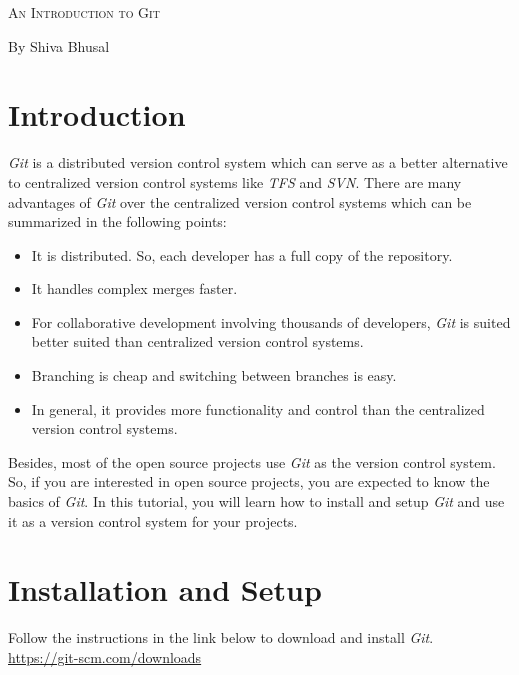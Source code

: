 \documentclass[letterpaper]{article}
\newcommand{\reporttitle}{An Introduction to Git}
\newcommand{\name}{By Shiva Bhusal}
\newcommand{\course}{}
\begin{document}
\begin{center}{\huge \scshape \reporttitle}\end{center}
\begin{center}\vspace{0.2em} {\Large \name\\}
  {\course}\end{center} 
  
\tableofcontents
  
\section{Introduction}
\textit{Git} is a distributed version control system which can serve as a better alternative to centralized version control systems like \textit{TFS} and \textit{SVN}. There are many advantages of \textit{Git} over the centralized version control systems which can be summarized in the following points:
\begin{itemize}
    \item It is distributed. So, each developer has a full copy of the repository.
    \item It handles complex merges faster.
    \item For collaborative development involving thousands of developers, \textit{Git} is suited better suited than centralized version control systems.
    \item Branching is cheap and switching between branches is easy.
    \item In general, it provides more functionality and control than the centralized version control systems.
\end{itemize}

Besides, most of the open source projects use \textit{Git} as the version control system. So, if you are interested in open source projects, you are expected to know the basics of \textit{Git}. In this tutorial, you will learn how to install and setup \textit{Git} and use it as a version control system for your projects. 

\section{Installation and Setup}
    Follow the instructions in the link below to download and install \textit{Git}.\\

\url{https://git-scm.com/downloads}
\\
\end{document}
